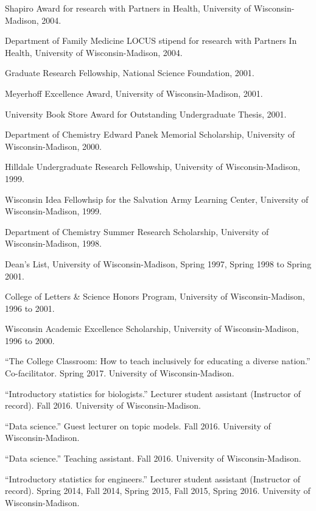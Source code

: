 \documentclass[11pt,article,oneside]{memoir}
\begin{document}
\ind Shapiro Award for research with Partners in Health, University of Wisconsin-Madison, 2004.

\ind Department of Family Medicine LOCUS stipend for research with Partners In Health, University of Wisconsin-Madison, 2004.

\ind Graduate Research Fellowship, National Science Foundation, 2001.

\ind Meyerhoff Excellence Award, University of Wisconsin-Madison, 2001.

\ind University Book Store Award for Outstanding Undergraduate Thesis, 2001.

\ind Department of Chemistry Edward Panek Memorial Scholarship, University of Wisconsin-Madison, 2000.

\ind Hilldale Undergraduate Research Fellowship, University of Wisconsin-Madison, 1999.

\ind Wisconsin Idea Fellowhsip for the Salvation Army Learning Center, University of Wisconsin-Madison, 1999.

\ind Department of Chemistry Summer Research Scholarship, University of Wisconsin-Madison, 1998.

\ind Dean's List, University of Wisconsin-Madison, Spring 1997, Spring 1998 to Spring 2001.

\ind College of Letters \& Science Honors Program, University of Wisconsin-Madison, 1996 to 2001.

\ind Wisconsin Academic Excellence Scholarship, University of Wisconsin-Madison, 1996 to 2000.

\bigskip 


\medskip

\ind ``The College Classroom: How to teach inclusively for educating a diverse nation.'' Co-facilitator. Spring 2017. University of Wisconsin-Madison.

\ind ``Introductory statistics for biologists.'' Lecturer student assistant (Instructor of record). Fall 2016. University of Wisconsin-Madison.

\ind ``Data science.'' Guest lecturer on topic models. Fall 2016. University of Wisconsin-Madison.

\ind ``Data science.'' Teaching assistant. Fall 2016. University of Wisconsin-Madison.

\ind ``Introductory statistics for engineers.'' Lecturer student assistant (Instructor of record). Spring 2014, Fall 2014, Spring 2015, Fall 2015, Spring 2016. University of Wisconsin-Madison.
\end{document}
